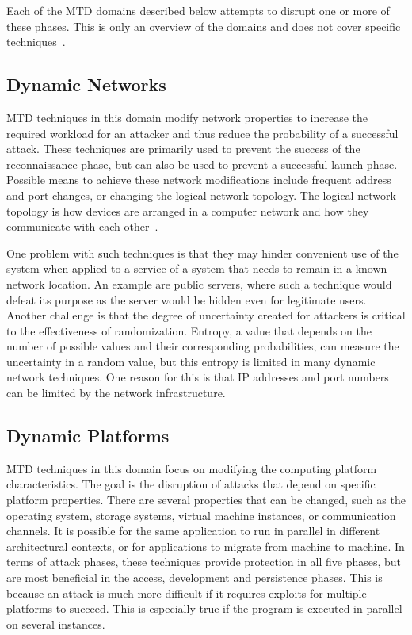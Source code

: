 Each of the MTD domains described below attempts to disrupt one or more of these phases. This is only an overview of the domains and does not cover specific techniques~\cite{article:okhraviFindingFocus}.     

\subsection{Dynamic Networks}
MTD techniques in this domain modify network properties to increase the required workload for an attacker and thus reduce the probability of a successful attack. These techniques are primarily used to prevent the success of the reconnaissance phase, but can also be used to prevent a successful launch phase. Possible means to achieve these network modifications include frequent address and port changes, or changing the logical network topology. The logical network topology is how devices are arranged in a computer network and how they communicate with each other~\cite{article:Santra2013}. 

One problem with such techniques is that they may hinder convenient use of the system when applied to a service of a system that needs to remain in a known network location. An example are public servers, where such a technique would defeat its purpose as the server would be hidden even for legitimate users. Another challenge is that the degree of uncertainty created for attackers is critical to the effectiveness of randomization. Entropy, a value that depends on the number of possible values and their corresponding probabilities, can measure the uncertainty in a random value, but this entropy is limited in many dynamic network techniques. One reason for this is that IP addresses and port numbers can be limited by the network infrastructure.  


\subsection{Dynamic Platforms}
MTD techniques in this domain focus on modifying the computing platform characteristics. The goal is the disruption of attacks that depend on specific platform properties. There are several properties that can be changed, such as the operating system, storage systems, virtual machine instances, or communication channels. It is possible for the same application to run in parallel in different architectural contexts, or for applications to migrate from machine to machine. In terms of attack phases, these techniques provide protection in all five phases, but are most beneficial in the access, development and persistence phases. This is because an attack is much more difficult if it requires exploits for multiple platforms to succeed. This is especially true if the program is executed in parallel on several instances. 

